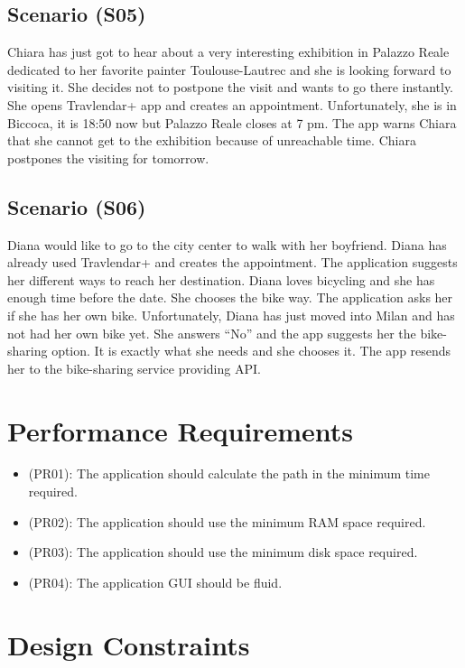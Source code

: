 \documentclass[a4paper,leqno]{book}
\begin{document}
\subsection{Scenario (S05)}
Chiara has just got to hear about a very interesting exhibition in Palazzo Reale dedicated to her favorite painter Toulouse-Lautrec and she is looking forward to visiting it. She decides not to postpone the visit and wants to go there instantly. She opens Travlendar+ app and creates an appointment. Unfortunately, she is in Biccoca, it is 18:50 now but Palazzo Reale closes at 7 pm.   The app warns Chiara that she cannot get to the exhibition because of unreachable time. Chiara postpones the visiting for tomorrow.

\subsection{Scenario (S06)}
Diana would like to go to the city center to walk with her boyfriend. Diana has already used Travlendar+ and creates the appointment. The application suggests her different ways to reach her destination. Diana loves bicycling and she has enough time before the date. She chooses the bike way. The application asks her if she has her own bike. Unfortunately, Diana has just moved into Milan and has not had her own bike yet. She answers “No” and the app suggests her the bike-sharing option. It is exactly what she needs and she chooses it. The app resends her to the bike-sharing service providing API. 


\section{Performance Requirements}
\begin{itemize}
\item (PR01): The application should calculate the path in the minimum time required.
\item (PR02): The application should use the minimum RAM space required.
\item (PR03): The application should use the minimum disk space required.
\item (PR04): The application GUI should be fluid.
\end{itemize}

\section{Design Constraints}
\end{document}

